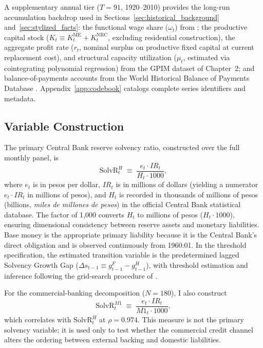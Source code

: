 A supplementary annual tier ($T = 91$, 1920--2010) provides the long-run accumulation backdrop used in Sections~\ref{sec:historical_background} and~\ref{sec:stylized_facts}: the functional wage share ($\omega_t$) from \citet{Astorga2023}; the productive capital stock ($K_t \equiv K^{\text{ME}}_t + K^{\text{NRC}}_t$, excluding residential construction), the aggregate profit rate ($r_t$, nominal surplus on productive fixed capital at current replacement cost), and structural capacity utilization ($\mu_t$, estimated via cointegrating polynomial regression) from the GPIM dataset of Chapter~2; and balance-of-payments accounts from the World Historical Balance of Payments Database \citep{NievasPiketty2025}. Appendix~\ref{app:codebook} catalogs complete series identifiers and metadata.

\subsection{Variable Construction}
\label{sec:variable_construction}

The primary Central Bank reserve solvency ratio, constructed over the full monthly panel, is
\begin{equation}
	\text{SolvR}^H_t \;\equiv\; \frac{e_t \cdot IR_t}{H_t \cdot 1000},
	\label{eq:solvr_h}
\end{equation}
where $e_t$ is in pesos per dollar, $IR_t$ is in millions of dollars (yielding a numerator $e_t \cdot IR_t$ in millions of pesos), and $H_t$ is recorded in thousands of millions of pesos (billions, \emph{miles de millones de pesos}) in the official Central Bank statistical database. The factor of 1{,}000 converts $H_t$ to millions of pesos ($H_t \cdot 1000$), ensuring dimensional consistency between reserve assets and monetary liabilities. Base money is the appropriate primary liability because it is the Central Bank's direct obligation and is observed continuously from 1960:01. In the threshold specification, the estimated transition variable is the predetermined lagged Solvency Growth Gap ($\Delta s_{t-1} \equiv g^F_{t-1} - g^H_{t-1}$), with threshold estimation and inference following the grid-search procedure of \citet{Hansen1999}.

For the commercial-banking decomposition ($N = 180$), I also construct
\[
\text{SolvR}^{M1}_t \;\equiv\; \frac{e_t \cdot IR_t}{M1_t \cdot 1000},
\]
which correlates with $\text{SolvR}^H_t$ at $\rho = 0.974$. This measure is not the primary solvency variable; it is used only to test whether the commercial credit channel alters the ordering between external backing and domestic liabilities.

